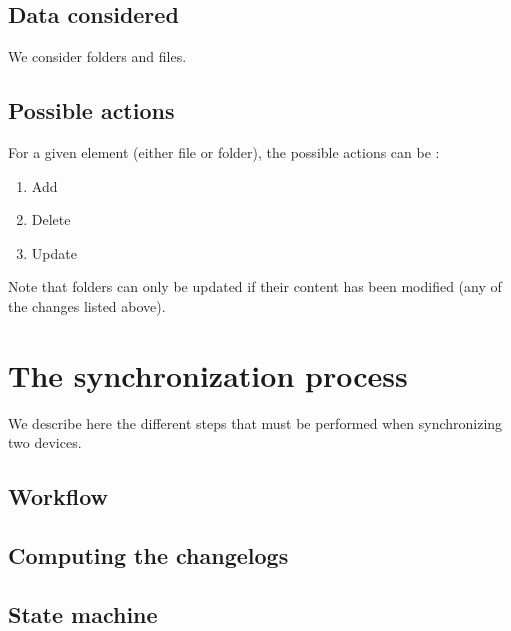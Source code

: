 \documentclass[10pt,a4paper]{article}
\begin{document}
\subsection{Data considered}

We consider folders and files.

\subsection{Possible actions}

For a given element (either file or folder), the possible actions can be :
\begin{enumerate}
\item Add
\item Delete
\item Update
\end{enumerate}

Note that folders can only be updated if their content has been modified (any of the changes listed above).

\section{The synchronization process}

We describe here the different steps that must be performed when synchronizing two devices.

\subsection{Workflow}

\subsection{Computing the changelogs}

\subsection{State machine}

\newcommand{\logstate}[1]{\textsc{#1}}
\newcommand{\sub}[0]{\logstate{sub}}
\newcommand{\unsub}[0]{\logstate{unsub}}
\newcommand{\subrm}[0]{\logstate{rm}}
\newcommand{\track}[0]{\logstate{add}}
\newcommand{\trackrm}[0]{\logstate{rm}}

\newcommand{\physstate}[1]{\textsc{#1}}
\newcommand{\same}[0]{\physstate{sam}}
\newcommand{\modif}[0]{\physstate{upd}}
\newcommand{\present}[0]{\physstate{add}}
\newcommand{\absent}[0]{\physstate{rm}}
\end{document}
